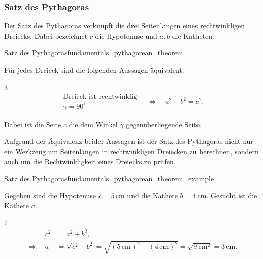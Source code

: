 \subsubsection{Satz des Pythagoras}
\label{subsubsec:fundamentals_right_triangles_pythagorean_theorem}

Der Satz des Pythagoras verknüpft die drei Seitenlängen eines rechtwinkligen
Dreiecks. Dabei bezeichnet $c$ die Hypotenuse und $a,b$ die Katheten.

\begin{TheoremBox}{Satz des Pythagoras}{fundamentals_pythagorean_theorem}
  \noindent
  \begin{minipage}[t]{0.64\linewidth}
    Für jedes Dreieck sind die folgenden Aussagen äquivalent:
    \begin{ClozeArea}[22]{3}
      \[
        \begin{gathered}
          \text{Dreieck ist rechtwinklig}\\[-0.1em]
          \gamma=90^\circ
        \end{gathered}
        \quad \Longleftrightarrow \quad
        a^2+b^2=c^2.
      \]
    \end{ClozeArea}
    Dabei ist die Seite $c$ die dem Winkel $\gamma$ gegenüberliegende Seite.
  \end{minipage}\hfill
  \begin{minipage}[t]{0.31\linewidth}
    \vspace{0pt}
    \centering
  \end{minipage}
\end{TheoremBox}
Aufgrund der Äquivalenz beider Aussagen ist der Satz des Pythagoras nicht nur ein Werkzeug
um Seitenlängen in rechtwinkligen Dreiecken zu berechnen, sondern auch um die
Rechtwinkligkeit eines Dreiecks zu prüfen.

\begin{ExampleBox}{Satz des Pythagoras}{fundamentals_pythagorean_theorem_example}
  \begin{minipage}[c]{0.62\linewidth}
  Gegeben sind die Hypotenuse $c=5\,\mathrm{cm}$ und die Kathete
  $b=4\,\mathrm{cm}$. Gesucht ist die Kathete $a$.
    \begin{ClozeArea}[22]{7}
      \begin{align*}
        \phantom{\Longrightarrow \quad} c^2&=a^2+b^2,\\
        \Longrightarrow \quad a&=\sqrt{c^2-b^2}=\sqrt{(5\,\mathrm{cm})^2-(4\,\mathrm{cm})^2}
         =\sqrt{9\,\mathrm{cm}^2}=3\,\mathrm{cm}.
      \end{align*}
    \end{ClozeArea}
  \end{minipage}\hfill
  \begin{minipage}[c]{0.33\linewidth}
    \centering
  \end{minipage}
\end{ExampleBox}
